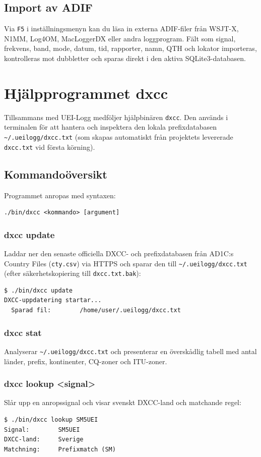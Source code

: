 \documentclass[11pt,a4paper]{article}
\begin{document}
\subsection{Import av ADIF}
Via \texttt{F5} i inställningsmenyn kan du läsa in externa ADIF-filer från WSJT-X, N1MM, Log4OM, MacLoggerDX eller andra loggprogram. Fält som signal, frekvens, band, mode, datum, tid, rapporter, namn, QTH och lokator importeras, kontrolleras mot dubbletter och sparas direkt i den aktiva SQLite3-databasen.

\section{Hjälpprogrammet dxcc}
\label{sec:dxcc}

Tillsammans med UEI-Logg medföljer hjälpbinären \texttt{dxcc}. Den används i terminalen för att hantera och inspektera den lokala prefixdatabasen \texttt{\textasciitilde/.ueilogg/dxcc.txt} (som skapas automatiskt från projektets levererade \texttt{dxcc.txt} vid första körning).

\subsection{Kommandoöversikt}
Programmet anropas med syntaxen:
\begin{verbatim}
./bin/dxcc <kommando> [argument]
\end{verbatim}

\subsubsection{dxcc update}
Laddar ner den senaste officiella DXCC- och prefixdatabasen från AD1C:s Country Files (\texttt{cty.csv}) via HTTPS och sparar den till \texttt{\textasciitilde/.ueilogg/dxcc.txt} (efter säkerhetskopiering till \texttt{dxcc.txt.bak}):
\begin{verbatim}
$ ./bin/dxcc update
DXCC-uppdatering startar...
  Sparad fil:        /home/user/.ueilogg/dxcc.txt
\end{verbatim}

\subsubsection{dxcc stat}
Analyserar \texttt{\textasciitilde/.ueilogg/dxcc.txt} och presenterar en överskådlig tabell med antal länder, prefix, kontinenter, CQ-zoner och ITU-zoner.

\subsubsection{dxcc lookup <signal>}
Slår upp en anropssignal och visar svenskt DXCC-land och matchande regel:
\begin{verbatim}
$ ./bin/dxcc lookup SM5UEI
Signal:        SM5UEI
DXCC-land:     Sverige
Matchning:     Prefixmatch (SM)
\end{verbatim}
\end{document}
